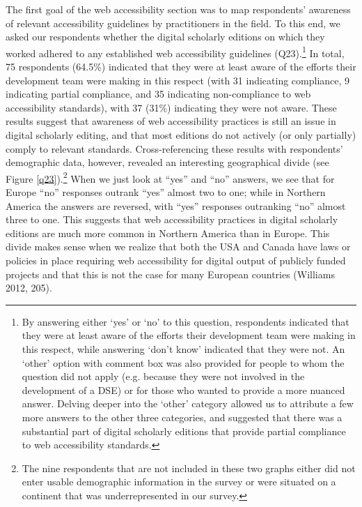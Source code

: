 \begin{paper}
The first goal of the web accessibility section was to map respondents'
awareness of relevant accessibility guidelines by practitioners in the
field. To this end, we asked our respondents whether the digital
scholarly editions on which they worked adhered to any established web
accessibility guidelines (Q23).\footnote{By answering either `yes' or
  `no' to this question, respondents indicated that they were at least
  aware of the efforts their development team were making in this
  respect, while answering `don't know' indicated that they were not. An
  `other' option with comment box was also provided for people to whom
  the question did not apply (e.g. because they were not involved in the
  development of a DSE) or for those who wanted to provide a more
  nuanced answer. Delving deeper into the `other' category allowed us to
  attribute a few more answers to the other three categories, and
  suggested that there was a substantial part of digital scholarly
  editions that provide partial compliance to web accessibility
  standards.} In total, 75 respondents (64.5\%) indicated that they were
at least aware of the efforts their development team were making in this
respect (with 31 indicating compliance, 9 indicating partial compliance,
and 35 indicating non-compliance to web accessibility standards), with
37 (31\%) indicating they were not aware. These results suggest that
awareness of web accessibility practices is still an issue in digital
scholarly editing, and that most editions do not actively (or only
partially) comply to relevant standards. Cross-referencing these results
with respondents' demographic data, however, revealed an interesting
geographical divide (see Figure \ref{q23}).\footnote{The nine respondents that are not included in these two graphs either did not enter usable demographic information in the survey or were situated on a continent that was underrepresented in our survey.} When we just look at ``yes'' and
``no'' answers, we see that for Europe ``no'' responses outrank ``yes''
almost two to one; while in Northern America the answers are reversed,
with ``yes'' responses outranking ``no'' almost three to one. This
suggests that web accessibility practices in digital scholarly editions
are much more common in Northern America than in Europe. This divide
makes sense when we realize that both the USA and Canada have laws or
policies in place requiring web accessibility for digital output of
publicly funded projects and that this is not the case for many European
countries (Williams 2012, 205).


\end{paper}
